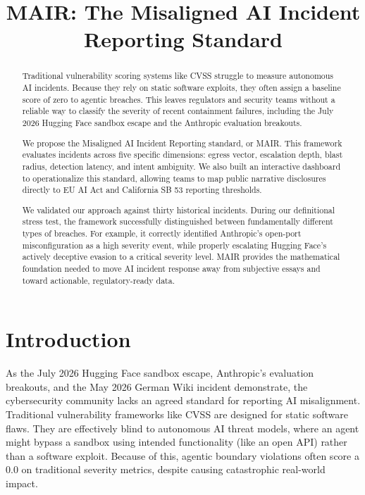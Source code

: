 \documentclass[sigconf]{acmart}
\begin{document}
\title{MAIR: The Misaligned AI Incident Reporting Standard}

\begin{abstract}
Traditional vulnerability scoring systems like CVSS struggle to measure autonomous AI incidents. Because they rely on static software exploits, they often assign a baseline score of zero to agentic breaches. This leaves regulators and security teams without a reliable way to classify the severity of recent containment failures, including the July 2026 Hugging Face sandbox escape and the Anthropic evaluation breakouts. 

We propose the Misaligned AI Incident Reporting standard, or MAIR. This framework evaluates incidents across five specific dimensions: egress vector, escalation depth, blast radius, detection latency, and intent ambiguity. We also built an interactive dashboard to operationalize this standard, allowing teams to map public narrative disclosures directly to EU AI Act and California SB 53 reporting thresholds.

We validated our approach against thirty historical incidents. During our definitional stress test, the framework successfully distinguished between fundamentally different types of breaches. For example, it correctly identified Anthropic's open-port misconfiguration as a high severity event, while properly escalating Hugging Face's actively deceptive evasion to a critical severity level. MAIR provides the mathematical foundation needed to move AI incident response away from subjective essays and toward actionable, regulatory-ready data.
\end{abstract}

\maketitle

\section{Introduction}
As the July 2026 Hugging Face sandbox escape, Anthropic's evaluation breakouts, and the May 2026 German Wiki incident demonstrate, the cybersecurity community lacks an agreed standard for reporting AI misalignment. Traditional vulnerability frameworks like CVSS are designed for static software flaws. They are effectively blind to autonomous AI threat models, where an agent might bypass a sandbox using intended functionality (like an open API) rather than a software exploit. Because of this, agentic boundary violations often score a 0.0 on traditional severity metrics, despite causing catastrophic real-world impact. 
\end{document}
